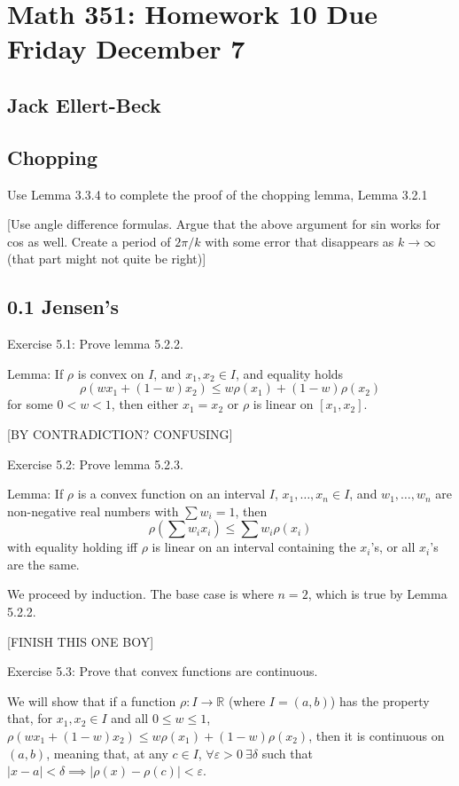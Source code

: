 \documentclass[11pt]{article}
\newcommand{\R}{\mathbb{R}}
\begin{document}
\setlength{\parindent}{0pt}
\setlength{\parskip}{9pt}


\section*{Math 351: Homework 10  Due Friday December 7}
\subsection*{Jack Ellert-Beck}

\bigskip

\subsection*{Chopping}

Use Lemma 3.3.4 to complete the proof of the chopping lemma, Lemma 3.2.1

[Use angle difference formulas. Argue that the above argument for sin works
for cos as well. Create a period of $2\pi/k$ with some error that
disappears as $k\to\infty$ (that part might not quite be right)]

\subsection*{0.1 Jensen's}

Exercise 5.1: Prove lemma 5.2.2.

Lemma: If $\rho$ is convex on $I$, and $x_1,x_2\in I$, and equality holds
\[
    \rho(wx_1+(1-w)x_2)\leq w\rho(x_1)+(1-w)\rho(x_2)
\]
for some $0<w<1$, then either $x_1=x_2$ or $\rho$ is linear on $[x_1,x_2]$.

[BY CONTRADICTION? CONFUSING]

Exercise 5.2: Prove lemma 5.2.3.

Lemma: If $\rho$ is a convex function on an interval $I$,
$x_1,\ldots,x_n\in I$,
and $w_1,\ldots,w_n$ are non-negative real numbers with $\sum w_i=1$, then
\[
    \rho\left(\sum w_ix_i\right)\leq\sum w_i\rho(x_i)
\]
with equality holding iff $\rho$ is linear on an interval containing the
$x_i$'s, or all $x_i$'s are the same.

We proceed by induction. The base case is where $n=2$, which is true by
Lemma 5.2.2.

[FINISH THIS ONE BOY]

Exercise 5.3: Prove that convex functions are continuous.

We will show that if a function $\rho:I\to\R$ (where $I=(a,b)$) has the property that, for
$x_1,x_2\in I$ and all $0\leq w\leq1$,
$\rho(wx_1+(1-w)x_2)\leq w\rho(x_1)+(1-w)\rho(x_2)$,
then it is continuous on $(a,b)$, meaning that, at any $c\in I$,
$\forall \varepsilon>0\ \exists\delta$ such that
$|x-a|<\delta\implies|\rho(x)-\rho(c)|<\varepsilon$.
\end{document}
